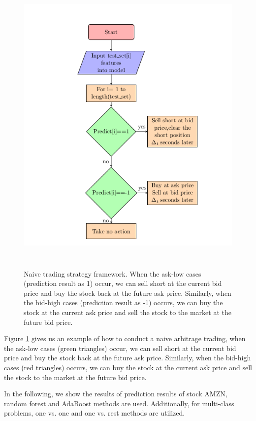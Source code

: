\begin{figure} [hp]
  \begin{center}
    \includegraphics[width=6in,  height=6in]{figures/strategy_algorithm.png}
  \end{center}
\caption{Naive trading strategy framework. When the ask-low cases (prediction result as 1) occur,   we can sell short at the current bid price and buy the stock back at the future ask price. Similarly,   when the bid-high cases (prediction result as -1) occurs,   we can buy the stock at the current ask price and sell the stock to the market at the future bid price. } \label{fig:strategy_algorithm}
\end{figure}


Figure \ref{fig:strategy_algorithm} gives us an example of how to conduct a naive arbitrage trading,   when the ask-low cases (green triangles)  occur,   we can sell short at the current bid price and buy the stock back at the future ask price. Similarly,   when the bid-high cases (red triangles) occurs,   we can buy the stock at the current ask price and sell the stock to the market at the future bid price. 

In the following, we show the results of prediction results of stock AMZN,   random forest and AdaBoost methods are used. Additionally,   for multi-class problems,   one vs. one and one vs. rest methods are utilized. 

